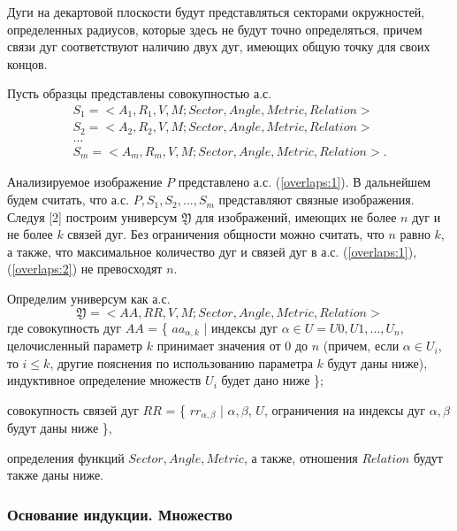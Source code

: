 \begin{remark}
Дуги на декартовой плоскости будут представляться секторами окружностей, определенных радиусов, которые здесь не будут точно определяться, причем связи дуг соответствуют наличию двух дуг, имеющих общую точку для своих концов.  
\end{remark}
Пусть образцы представлены совокупностью   а.с. 
\begin{equation}
\begin{array}{c}
S_1 = < A_1, R_1, V, M; Sector,Angle,Metric,Relation > \\
S_2 = < A_2, R_2, V, M; Sector,Angle,Metric,Relation >  \\                                        
\dots \\
S_m = < A_m, R_m, V, M; Sector,Angle,Metric,Relation >.
\end{array}
\label{overlaps:2}
\end{equation}

Анализируемое изображение $P$ представлено  а.с.  (\ref{overlaps:1}). В дальнейшем будем считать, что а.с. $P, S_1, S_2, . . ., S_m$  представляют связные изображения. 
Следуя [2] построим универсум $\mathfrak{Y}$ для изображений, имеющих не более $n$ дуг и не более $k$ связей дуг. Без ограничения общности можно считать, что $n$ равно $k$, а также, что максимальное количество дуг и связей дуг в  а.с. (\ref{overlaps:1}), (\ref{overlaps:2})  не превосходят  $n$.    

Определим универсум как  а.с.  
\begin{equation}
\mathfrak{Y} = < AA, RR, V, M; Sector,  Angle, Metric, Relation >
\label{overlaps:3}
\end{equation}
\noindent
где  совокупность дуг $AA$ = \{ $aa_{\alpha,k}$ | индексы дуг $\alpha \in U = U0, U1, ..., U_n$,  целочисленный параметр  $k$  принимает значения от  0  до $n$ (причем,  если  $\alpha \in  U_i$,  то $i \leq k$, другие  пояснения по использованию параметра  $k$  будут даны ниже),  индуктивное определение множеств  $U_i$  будет дано ниже \};


совокупность связей дуг $RR$ = \{ $rr_{\alpha, \beta}$ | $\alpha, \beta$, $U$, ограничения на индексы дуг $\alpha, \beta$  будут даны ниже \}, 

определения функций  $Sector,  Angle, Metric$, а также, отношения $Relation$  будут также даны ниже.      \\

\subsubsection{Основание индукции.  Множество  }

